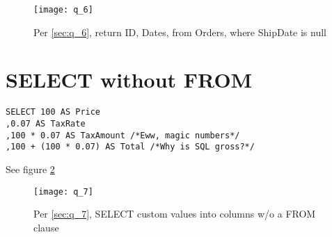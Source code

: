 \documentclass{article}
\begin{document}
\begin{figure}[H]\centering
	\caption{Per \ref{sec:q_6}, return ID, Dates, from Orders, where
	ShipDate is null}
	\texttt{[image: q\_6]}
	\label{fig:q_6}
\end{figure}

\section{SELECT without FROM}

\begin{lstlisting}
SELECT 100 AS Price
,0.07 AS TaxRate
,100 * 0.07 AS TaxAmount /*Eww, magic numbers*/
,100 + (100 * 0.07) AS Total /*Why is SQL gross?*/
\end{lstlisting}\label{sec:q_7}
See figure \ref{fig:q_7}

\begin{figure}[H]\centering
	\caption{Per \ref{sec:q_7}, SELECT custom values into columns w/o a
	FROM clause}
	\texttt{[image: q\_7]}
	\label{fig:q_7}
\end{figure}
\end{document}
